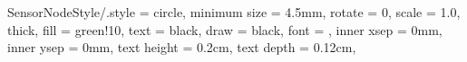 \def\BayStationPosition{(0,0)}
%
\def\SensorOnePosition{(-1.2,	-0.3)}
\def\SensorTwoPosition{(-1.5,	0.3)}
\def\SensorThreePosition{(-1.3,	1.1)}
\def\SensorFourPosition{(-0.3,	1.6)}
\def\SensorFivePosition{(0.3,	2.2)}
\def\SensorSixPosition{(0.7,	1.7)}
\def\SensorSevenPosition{(1.7,	1.8)}
\def\SensorEightPosition{(1.6,	0.8)}
\def\SensorNinePosition{(2.1,	0.3)}
\def\SensorTenPosition{(1.8,	-0.4)}
\def\SensorElevenPosition{(1.0,	-0.7)}
\def\SensorTwelvePosition{(1.0,	-1.4)}
\def\SensorThirteenPosition{(0.0,	-2.2)}
\def\SensorFourteenPosition{(-0.3,	-1.4)}
\def\SensorFifteenPosition{(-1.3,	-1.9)}





\tikzset
{
	SensorNodeStyle/.style =
	{
		circle,									%
		minimum size	= 4.5mm,				%
		rotate			= 0,					%
		scale			= 1.0,					%
		thick,									%
		fill			= green!10,				%
		text			= black,				%
		draw			= black,				%
		font			= \scriptsize,				%
		inner xsep		= 0mm,					%
		inner ysep		= 0mm,					%
		text height		= 0.2cm,
		text depth		= 0.12cm,
	}
}






